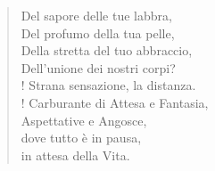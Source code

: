 
\begin{verse}
Del sapore delle tue labbra,\\
Del profumo della tua pelle,\\
Della stretta del tuo abbraccio,\\
Dell'unione dei nostri corpi?\\!
Strana sensazione, la distanza.\\!
Carburante di Attesa e Fantasia,\\
Aspettative e Angosce,\\
dove tutto è in pausa,\\
in attesa della Vita.

\end{verse}
